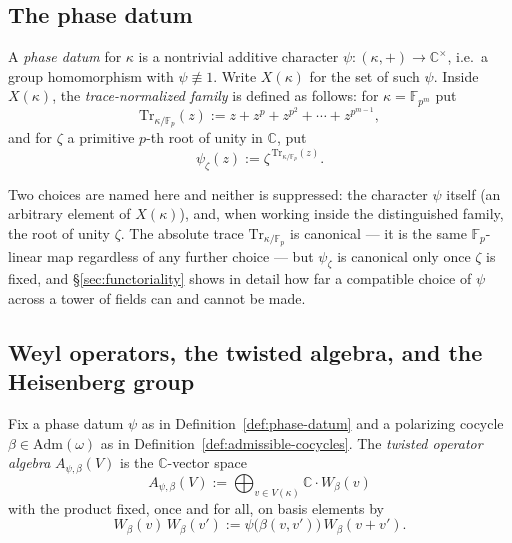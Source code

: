 
\subsection{The phase datum}
\label{ssec:phase-datum}

\begin{definition}
\label{def:phase-datum}
A \emph{phase datum} for $\kappa$ is a nontrivial additive character
$\psi : (\kappa,+) \to \mathbb{C}^\times$, i.e.\ a group homomorphism with
$\psi \not\equiv 1$. Write $X(\kappa)$ for the set of such $\psi$. Inside
$X(\kappa)$, the \emph{trace-normalized family} is defined as follows: for
$\kappa = \mathbb{F}_{p^m}$ put
\[
\mathrm{Tr}_{\kappa/\mathbb{F}_p}(z) := z + z^p + z^{p^2} + \cdots +
z^{p^{m-1}} ,
\]
and for $\zeta$ a primitive $p$-th root of unity in $\mathbb{C}$, put
\[
\psi_\zeta(z) := \zeta^{\,\mathrm{Tr}_{\kappa/\mathbb{F}_p}(z)} .
\]
\end{definition}

\begin{scope}
Two choices are named here and neither is suppressed: the character $\psi$
itself (an arbitrary element of $X(\kappa)$), and, when working inside the
distinguished family, the root of unity $\zeta$. The absolute trace
$\mathrm{Tr}_{\kappa/\mathbb{F}_p}$ is canonical — it is the same
$\mathbb{F}_p$-linear map regardless of any further choice — but $\psi_\zeta$
is canonical only once $\zeta$ is fixed, and \S\ref{sec:functoriality} shows
in detail how far a compatible choice of $\psi$ across a tower of fields can
and cannot be made.
\end{scope}


\subsection{Weyl operators, the twisted algebra, and the Heisenberg group}
\label{ssec:weyl-algebra}

\begin{definition}
\label{def:weyl-algebra}
Fix a phase datum $\psi$ as in Definition~\ref{def:phase-datum} and a
polarizing cocycle $\beta \in \mathrm{Adm}(\omega)$ as in
Definition~\ref{def:admissible-cocycles}. The \emph{twisted operator algebra}
$A_{\psi,\beta}(V)$ is the $\mathbb{C}$-vector space
\[
A_{\psi,\beta}(V) := \bigoplus_{v \in V(\kappa)} \mathbb{C}\cdot W_\beta(v)
\]
with the product fixed, once and for all, on basis elements by
\[
W_\beta(v)\, W_\beta(v') := \psi\big(\beta(v,v')\big)\, W_\beta(v+v') .
\]
\end{definition}

